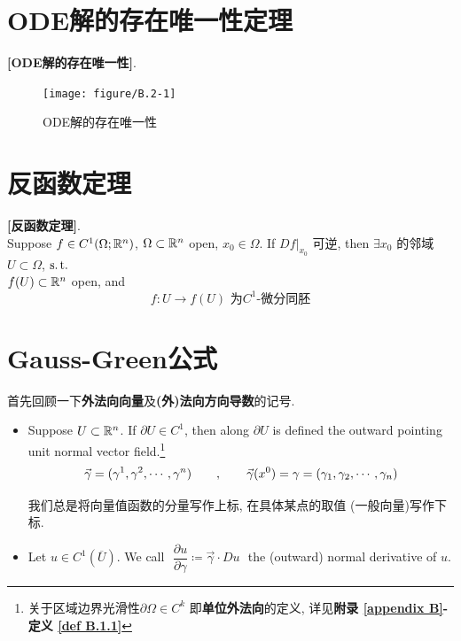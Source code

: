 \newpage

\section{ODE解的存在唯一性定理}
	\begin{thm}\label{thm B.2.1}
		\textbf{[ODE解的存在唯一性]}.
	\end{thm}
	
	\begin{figure}[thbp!]
		\centering
		\texttt{[image: figure/B.2-1]}
		\caption{ODE解的存在唯一性}
		\label{pic : B.2-1} %
	\end{figure}

\newpage

\section{反函数定理}
	\begin{thm}\label{thm B.3.1}
		\textbf{[反函数定理]}. \\
		Suppose $f \in C^{1}(\Omega ; \mathbb{R}^n)$, $\Omega \subset \mathbb{R}^n$ open, $x_0 \in \Omega$. If $Df|_{x_0}$ 可逆, then $\exists x_0$ 的邻域$U \subset \Omega$, $\operatorname{s.t.}$ \\
		$f(U) \subset \mathbb{R}^n$ open, and
		\[ f : U \longrightarrow f(U) \,\, \textbf{为$C^1$-微分同胚} \]
	\end{thm}

\newpage

\section{Gauss-Green公式}
	首先回顾一下\textbf{外法向向量}及\textbf{(外)法向方向导数}的记号.
	\begin{itemize}
		\item Suppose $U \subset \mathbb{R}^n$. If $\partial U \in C^1$, then along $\partial U$ is defined the outward pointing unit normal vector field.\footnote{关于区域边界光滑性$\partial \Omega \in C^k$ 即\textbf{单位外法向}的定义, 详见\textbf{附录 \ref{appendix B}-定义 \ref{def B.1.1}}}
		\[ \vec{\gamma} = (\gamma^1 , \gamma^2 , \cdots , \gamma^n) 
		\hspace*{2em} , \hspace*{2em} 
		\vec{\gamma}(x^0) = \gamma = (\gamma_1 , \gamma_2 , \cdots , \gamma_n) \]
	
		\begin{rmk}
			我们总是将向量值函数的分量写作上标, 在具体某点的取值 (一般向量)写作下标.
		\end{rmk}
	
		\vspace{2em}
	
		\item Let $u \in C^{1}(\overline{U})$. We call $\,\, \dfrac{\partial u}{\partial \gamma} \coloneqq \vec{\gamma} \cdot Du \,\,$ the (outward) normal derivative of $u$.
	\end{itemize}

